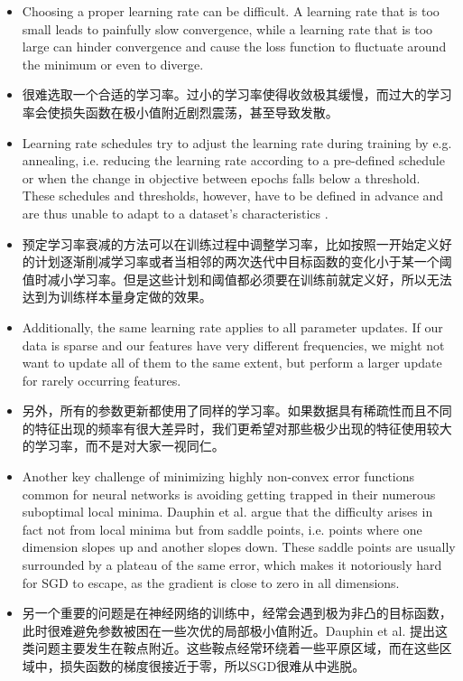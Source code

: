 \documentclass{article}
\begin{document}
\begin{itemize}
\item Choosing a proper learning rate can be difficult. A learning rate that is too small leads to painfully slow convergence, while a learning rate that is too large can hinder convergence and cause the loss function to fluctuate around the minimum or even to diverge.
\item 很难选取一个合适的学习率。过小的学习率使得收敛极其缓慢，而过大的学习率会使损失函数在极小值附近剧烈震荡，甚至导致发散。
\item Learning rate schedules \cite{Robbins1951} try to adjust the learning rate during training by e.g. annealing, i.e. reducing the learning rate according to a pre-defined schedule or when the change in objective between epochs falls below a threshold. These schedules and thresholds, however, have to be defined in advance and are thus unable to adapt to a dataset's characteristics \cite{Darken1992}.
\item 预定学习率衰减\cite{Robbins1951}的方法可以在训练过程中调整学习率，比如按照一开始定义好的计划逐渐削减学习率或者当相邻的两次迭代中目标函数的变化小于某一个阈值时减小学习率。但是这些计划和阈值都必须要在训练前就定义好，所以无法达到为训练样本量身定做的效果。
\item Additionally, the same learning rate applies to all parameter updates. If our data is sparse and our features have very different frequencies, we might not want to update all of them to the same extent, but perform a larger update for rarely occurring features.
\item 另外，所有的参数更新都使用了同样的学习率。如果数据具有稀疏性而且不同的特征出现的频率有很大差异时，我们更希望对那些极少出现的特征使用较大的学习率，而不是对大家一视同仁。
\item Another key challenge of minimizing highly non-convex error functions common for neural networks is avoiding getting trapped in their numerous suboptimal local minima. Dauphin et al. \cite{Dauphin2014} argue that the difficulty arises in fact not from local minima but from saddle points, i.e. points where one dimension slopes up and another slopes down. These saddle points are usually surrounded by a plateau of the same error, which makes it notoriously hard for SGD to escape, as the gradient is close to zero in all dimensions.
\item 另一个重要的问题是在神经网络的训练中，经常会遇到极为非凸的目标函数，此时很难避免参数被困在一些次优的局部极小值附近。Dauphin et al. \cite{Dauphin2014} 提出这类问题主要发生在鞍点附近。这些鞍点经常环绕着一些平原区域，而在这些区域中，损失函数的梯度很接近于零，所以SGD很难从中逃脱。
\end{itemize}
\end{document}
